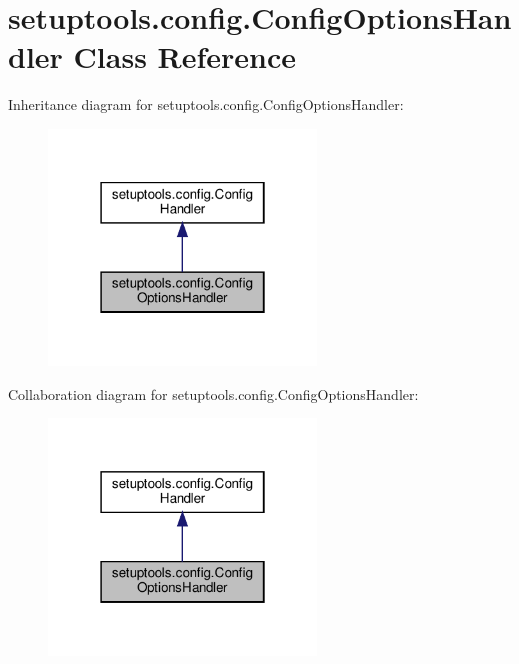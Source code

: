 \hypertarget{classsetuptools_1_1config_1_1ConfigOptionsHandler}{}\section{setuptools.\+config.\+Config\+Options\+Handler Class Reference}
\label{classsetuptools_1_1config_1_1ConfigOptionsHandler}


Inheritance diagram for setuptools.\+config.\+Config\+Options\+Handler\+:
\nopagebreak
\begin{figure}[H]
\begin{center}
\leavevmode
\includegraphics[width=202pt]{classsetuptools_1_1config_1_1ConfigOptionsHandler__inherit__graph}
\end{center}
\end{figure}


Collaboration diagram for setuptools.\+config.\+Config\+Options\+Handler\+:
\nopagebreak
\begin{figure}[H]
\begin{center}
\leavevmode
\includegraphics[width=202pt]{classsetuptools_1_1config_1_1ConfigOptionsHandler__coll__graph}
\end{center}
\end{figure}

